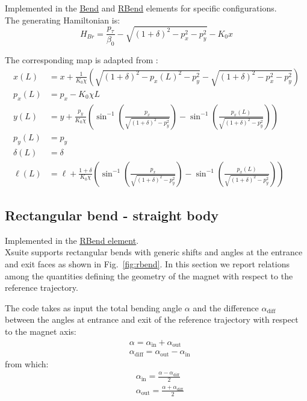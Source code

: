 Implemented in the \href{https://xsuite.readthedocs.io/en/latest/apireference.html#bend}{\underline{Bend}}
and \href{https://xsuite.readthedocs.io/en/latest/apireference.html#rbend}{\underline{RBend}} elements
for specific configurations.
~\\

The generating Hamiltonian is:
\begin{equation}
H_{Br} = \frac{p_\tau}{\beta_0} -\sqrt{(1 + \delta)^2 - p_x^2 - p_y^2} - K_0 x
\end{equation}

The corresponding map is adapted from \cite{forest99}:
\begin{align}
x(L) &= x + \frac{1}{K_0 \chi} \left( \sqrt{(1 + \delta)^2 - p_x(L)^2 - p_y^2} - \sqrt{(1 + \delta)^2 - p_x^2 - p_y^2} \right)
\label{eq:straight_bend_x}\\
p_x(L) &= p_x - K_0 \chi L \label{eq:straight_bend_px}\\
y(L) &= y + \frac{p_y}{K_0 \chi} \left( \sin^{-1} \left( \frac{p_x}{\sqrt{(1 + \delta)^2 - p_y^2}} \right) - \sin^{-1} \left( \frac{p_x(L)}{\sqrt{(1 + \delta)^2 - p_y^2}} \right) \right) \\
p_y(L) &= p_y \\
\delta(L) &= \delta \\
\ell(L) &= \ell +
\frac{1 + \delta}{K_0 \chi} \left( \sin^{-1} \left( \frac{p_x}{\sqrt{(1 + \delta)^2 - p_y^2}} \right) - \sin^{-1} \left( \frac{p_x(L)}{\sqrt{(1 + \delta)^2 - p_y^2}} \right) \right)
\label{eq:straight_bend_ell}
\end{align}

\subsection{Rectangular bend - straight body}

Implemented in the \href{https://xsuite.readthedocs.io/en/latest/apireference.html#rbend}{\underline{RBend element}}.
~\\

Xsuite supports rectangular bends with generic shifts and angles at the
entrance and exit faces as shown in Fig.~\ref{fig:rbend}. In this section we report
relations among the quantities defining the geometry of the magnet with respect
to the reference trajectory.

The code takes as input the total bending angle $\alpha$ and the difference
$\alpha_\text{diff}$ between the angles at entrance and exit of the reference
trajectory with respect to the magnet axis:
\begin{align}
&\alpha = \alpha_\text{in} + \alpha_\text{out} \\
&\alpha_\text{diff} = \alpha_\text{out} - \alpha_\text{in}
\end{align}
from which:
\begin{align}
&\alpha_\text{in} = \frac{\alpha - \alpha_\text{diff}}{2} \\
&\alpha_\text{out} = \frac{\alpha + \alpha_\text{diff}}{2}
\end{align}

